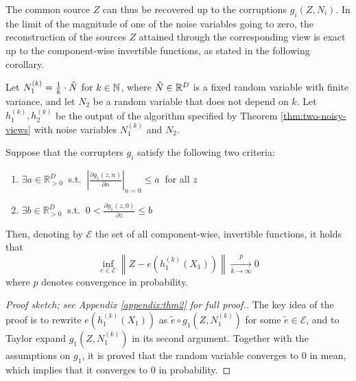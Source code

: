 The common source $Z$ can thus be recovered up to the corruptions ${g}_i(Z, N_i)$.
In the limit of the magnitude of one of the noise variables going to zero, the reconstruction of the sources $Z$ attained through the corresponding view is exact up to the component-wise invertible functions, as stated in the following corollary.

\medskip
\begin{corollary}
	\label{crl:lownoise}
	Let $N_1^{(k)} = \frac{1}{k} \cdot  \Tilde{N}$ for $k \in \mathbb{N}$, where $\Tilde{N}\in\mathbb{R}^D$ is a fixed random variable with finite variance, and let $N_2$ be a random variable that does not depend on $k$.
	Let $h_1^{(k)}, h_2^{(k)}$ be the output of the algorithm specified by Theorem \ref{thm:two-noisy-views} with noise variables $N_1^{(k)}$ and $N_2$.
	
	Suppose that the corrupters $g_i$ satisfy the following two criteria:
	\begin{enumerate}
		\item $\exists {a}  \in \mathbb{R}_{> 0}^D \: $   s.t. $\: \left|\frac{\partial g_1(z,n)}{\partial n} \right|_{n=0} \leq {a} \: $ for all ${z}$
		\item $\exists {b}  \in \mathbb{R}_{> 0}^D \: $ s.t. $\: 0<\frac{\partial g_1(z,0)}{\partial z} \leq b$
	\end{enumerate}
	Then, denoting by $\mathcal{E}$ the set of all component-wise, invertible functions, it holds that
	\[
	 \inf_{{e}\in \mathcal{E}}  \left \|Z - {e}(h_1^{(k)}(X_1)) \right \| \xrightarrow[k \to \infty]{p} 0
	\]
	where $p$ denotes convergence in probability.
\end{corollary}

\begin{proof}[Proof sketch; see Appendix \ref{appendix:thm2} for full proof.]
The key idea of the proof is to rewrite ${e}(h_1^{(k)}(X_1))$ as $\tilde{e} \circ g_1(Z, N_1^{(k)})$ for some $\tilde{e} \in \mathcal{E}$, and to Taylor expand $g_1(Z, N_1^{(k)})$ in its second argument.
Together with the assumptions on $g_1$, it is proved that the random variable converges to $0$ in mean, which implies that it converges to $0$ in probability.
\end{proof}

